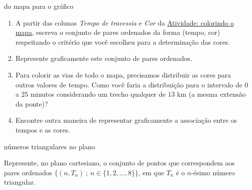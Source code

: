 \begin{task}{ do mapa para o gráfico}
\label{\detokenize{AF106-4:ativ-funcoes-do-mapa-para-grafico}}\label{\detokenize{AF106-4:atividade-do-mapa-para-o-grafico}}

\begin{enumerate}
\item {} 
A partir das colunas \emph{Tempo de travessia} e \emph{Cor} da {\hyperref[\detokenize{AF106-2:ativ-funcoes-colorindo-o-mapa}]{Atividade: colorindo o mapa}}, escreva o conjunto de pares ordenados da forma (tempo, cor) respeitando o critério que você escolheu para a determinação das cores.

\item {} 
Represente graficamente este conjunto de pares ordenados.

\item {} 
Para colorir as vias de todo o mapa, precisamos distribuir as cores para outros valores de tempo. Como você faria a distribuição para o intervalo de \(0\) a \(25\) minutos considerando um trecho qualquer de \(13\) km (a mesma extensão da ponte)?

\item {} 
Encontre outra maneira de representar graficamente a associação entre os tempos e as cores.

\end{enumerate}

\end{task}

\begin{task}{ números triangulares no plano}
\label{\detokenize{AF106-4:atividade-numeros-triangulares-no-plano}}\label{\detokenize{AF106-4:ativ-funcoes-numeros-triangulares}}

Represente, no plano cartesiano, o conjunto de pontos que correspondem aos pares ordenados \(\{(n,T_n)\ ;\ n\in\{1,2,...,8\}\}\), em que \(T_n\) é o \(n\)-ésimo número triangular.

\end{task}

